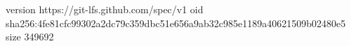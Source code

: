 version https://git-lfs.github.com/spec/v1
oid sha256:4fe81cfc99302a2dc79c359dbc51e656a9ab32c985e1189a40621509b02480e5
size 349692

